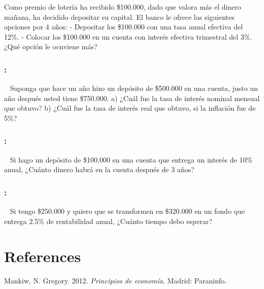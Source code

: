 \documentclass[
  letterpaper,
  DIV=11,
  numbers=noendperiod]{scrreport}
\newlength{\cslhangindent}
\newlength{\cslentryspacingunit} %
\newenvironment{CSLReferences}[2] %
 {%
  \setlength{\parindent}{0pt}
  \ifodd #1
  \let\oldpar\par
  \def\par{\hangindent=\cslhangindent\oldpar}
  \fi
  \setlength{\parskip}{#2\cslentryspacingunit}
 }%
 {}
\begin{document}
Como premio de lotería ha recibido \$100.000, dado que valora más el
dinero mañana, ha decidido depositar su capital. El banco le ofrece las
siguientes opciones por 4 años: - Depositar los \$100.000 con una tasa
anual efectiva del 12\%. - Colocar los \$100.000 en un cuenta con
interés efectiva trimestral del 3\%. ~ ¿Qué opción le ocnviene más?

\hypertarget{section-64}{%
\subsection{:}\label{section-64}}

~ Suponga que hace un año hizo un depósito de \$500.000 en una cuenta,
justo un año después usted tiene \$750.000. a) ¿Cuál fue la tasa de
interés nominal mensual que obtuvo? b) ¿Cuál fue la tasa de interés real
que obtuvo, si la inflación fue de 5\%?

\hypertarget{section-65}{%
\subsection{:}\label{section-65}}

~ Si hago un depósito de \$100.000 en una cuenta que entrega un interés
de 10\% anual, ¿Cuánto dinero habrá en la cuenta después de 3 años?

\hypertarget{section-66}{%
\subsection{:}\label{section-66}}

~ Si tengo \$250.000 y quiero que se transformen en \$320.000 en un
fondo que entrega 2.5\% de rentabilidad anual, ¿Cuánto tiempo debo
esperar?


\hypertarget{references}{%
\chapter*{References}\label{references}}


\hypertarget{refs}{}
\begin{CSLReferences}{1}{0}
\leavevmode{}%
Mankiw, N. Gregory. 2012. \emph{Principios de economía}. Madrid:
Paraninfo.

\end{CSLReferences}
\end{document}
